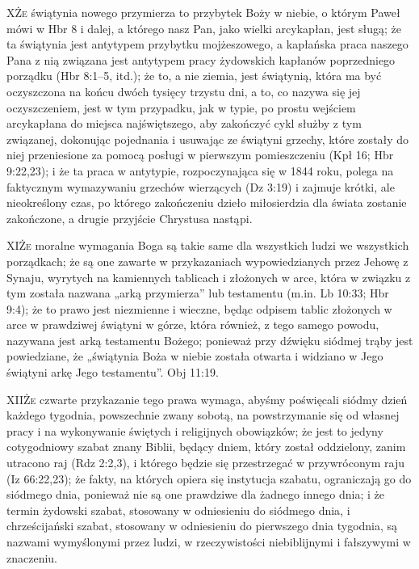 \lettrine{X}{Że} świątynia nowego przymierza to przybytek Boży w niebie, o którym Paweł mówi w Hbr 8 i dalej, a którego nasz Pan, jako wielki arcykapłan, jest sługą; że ta świątynia jest antytypem przybytku mojżeszowego, a kapłańska praca naszego Pana z nią związana jest antytypem pracy żydowskich kapłanów poprzedniego porządku (Hbr 8:1--5, itd.); że to, a nie ziemia, jest świątynią, która ma być oczyszczona na końcu dwóch tysięcy trzystu dni, a to, co nazywa się jej oczyszczeniem, jest w tym przypadku, jak w typie, po prostu wejściem arcykapłana do miejsca najświętszego, aby zakończyć cykl służby z tym związanej, dokonując pojednania i usuwając ze świątyni grzechy, które zostały do niej przeniesione za pomocą posługi w pierwszym pomieszczeniu (Kpł 16; Hbr 9:22,23); i że ta praca w antytypie, rozpoczynająca się w 1844 roku, polega na faktycznym wymazywaniu grzechów wierzących (Dz 3:19) i zajmuje krótki, ale nieokreślony czas, po którego zakończeniu dzieło miłosierdzia dla świata zostanie zakończone, a drugie przyjście Chrystusa nastąpi.

\lettrine{XI}{Że} moralne wymagania Boga są takie same dla wszystkich ludzi we wszystkich porządkach; że są one zawarte w przykazaniach wypowiedzianych przez Jehowę z Synaju, wyrytych na kamiennych tablicach i złożonych w arce, która w związku z tym została nazwana „arką przymierza” lub testamentu (m.in. Lb 10:33; Hbr 9:4); że to prawo jest niezmienne i wieczne, będąc odpisem tablic złożonych w arce w prawdziwej świątyni w górze, która również, z tego samego powodu, nazywana jest arką testamentu Bożego; ponieważ przy dźwięku siódmej trąby jest powiedziane, że „świątynia Boża w niebie została otwarta i widziano w Jego świątyni arkę Jego testamentu”. Obj 11:19.

\lettrine{XII}{Że} czwarte przykazanie tego prawa wymaga, abyśmy poświęcali siódmy dzień każdego tygodnia, powszechnie zwany sobotą, na powstrzymanie się od własnej pracy i na wykonywanie świętych i religijnych obowiązków; że jest to jedyny cotygodniowy szabat znany Biblii, będący dniem, który został oddzielony, zanim utracono raj (Rdz 2:2,3), i którego będzie się przestrzegać w przywróconym raju (Iz 66:22,23); że fakty, na których opiera się instytucja szabatu, ograniczają go do siódmego dnia, ponieważ nie są one prawdziwe dla żadnego innego dnia; i że termin żydowski szabat, stosowany w odniesieniu do siódmego dnia, i chrześcijański szabat, stosowany w odniesieniu do pierwszego dnia tygodnia, są nazwami wymyślonymi przez ludzi, w rzeczywistości niebiblijnymi i fałszywymi w znaczeniu.


